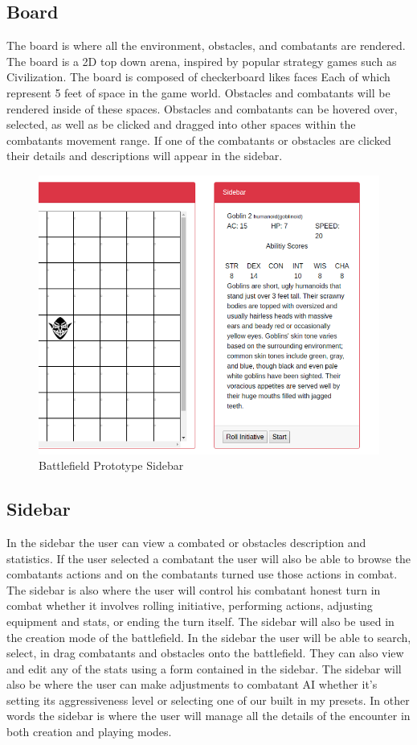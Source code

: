 \documentclass[12pt,a4paper]{report}
\begin{document}
\subsection {Board}
The board is where all the environment, obstacles, and combatants are rendered. The board is a 2D top down arena, inspired by popular strategy games such as Civilization. The board is composed of checkerboard likes faces Each of which represent 5 feet of space in the game world. Obstacles and combatants will be rendered inside of these spaces. Obstacles and combatants can be hovered over, selected, as well as be clicked and dragged into other spaces within the combatants movement range. If one of the combatants or obstacles are clicked their details and descriptions will appear in the sidebar. 
\begin{figure}[H]
	\centering
	\includegraphics[scale=.5]{encountercreatorsidebar}
	\caption{Battlefield Prototype Sidebar}
	\label{fig: Battlefield Prototype Sidebar}
\end{figure}
\subsection {Sidebar}
In the sidebar the user can view a combated or obstacles description and statistics. If the user selected a combatant the user will also be able to browse the combatants actions and on the combatants turned use those actions in combat. The sidebar is also where the user will control his combatant honest turn in combat whether it involves rolling initiative, performing actions, adjusting equipment and stats, or ending the turn itself. The sidebar will also be used in the creation mode of the battlefield. In the sidebar the user will be able to search, select, in drag combatants and obstacles onto the battlefield. They can also view and edit any of the stats using a form contained in the sidebar. The sidebar will also be where the user can make adjustments to combatant AI whether it's setting its aggressiveness level or selecting one of our built in my presets. In other words the sidebar is where the user will manage all the details of the encounter in both creation and playing modes. 
\end{document}
